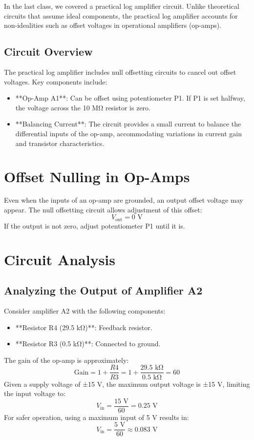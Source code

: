 In the last class, we covered a practical log amplifier circuit. Unlike theoretical circuits that assume ideal components, the practical log amplifier accounts for non-idealities such as offset voltages in operational amplifiers (op-amps).

\subsection{Circuit Overview}

The practical log amplifier includes null offsetting circuits to cancel out offset voltages. Key components include:
\begin{itemize}
    \item **Op-Amp A1**: Can be offset using potentiometer P1. If P1 is set halfway, the voltage across the 10 MΩ resistor is zero.
    \item **Balancing Current**: The circuit provides a small current to balance the differential inputs of the op-amp, accommodating variations in current gain and transistor characteristics.
\end{itemize}

\section{Offset Nulling in Op-Amps}

Even when the inputs of an op-amp are grounded, an output offset voltage may appear. The null offsetting circuit allows adjustment of this offset:
\begin{equation}
    V_{\text{out}} = 0 \text{ V}
\end{equation}
If the output is not zero, adjust potentiometer P1 until it is.

\section{Circuit Analysis}

\subsection{Analyzing the Output of Amplifier A2}

Consider amplifier A2 with the following components:
\begin{itemize}
    \item **Resistor R4 (29.5 kΩ)**: Feedback resistor.
    \item **Resistor R3 (0.5 kΩ)**: Connected to ground.
\end{itemize}
The gain of the op-amp is approximately:
\[
\text{Gain} = 1 + \frac{R4}{R3} = 1 + \frac{29.5 \text{ kΩ}}{0.5 \text{ kΩ}} = 60
\]
Given a supply voltage of ±15 V, the maximum output voltage is ±15 V, limiting the input voltage to:
\[
V_{\text{in}} = \frac{15 \text{ V}}{60} = 0.25 \text{ V}
\]
For safer operation, using a maximum input of 5 V results in:
\[
V_{\text{in}} = \frac{5 \text{ V}}{60} \approx 0.083 \text{ V}
\]


